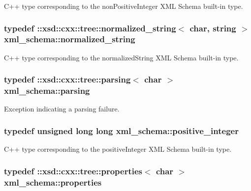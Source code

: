 C++ type corresponding to the non\-Positive\-Integer X\-M\-L Schema built-\/in type. 

\hypertarget{namespacexml__schema_a429c44c2779bb6c82332127aa59c61fe}{
\subsubsection[{normalized\-\_\-string}]{\setlength{\rightskip}{0pt plus 5cm}typedef \-::xsd\-::cxx\-::tree\-::normalized\-\_\-string$<$ char, {\bf string} $>$ {\bf xml\-\_\-schema\-::normalized\-\_\-string}}}\label{namespacexml__schema_a429c44c2779bb6c82332127aa59c61fe}


C++ type corresponding to the normalized\-String X\-M\-L Schema built-\/in type. 

\hypertarget{namespacexml__schema_a150f88d7d2156ae81807b142038684f5}{
\subsubsection[{parsing}]{\setlength{\rightskip}{0pt plus 5cm}typedef \-::xsd\-::cxx\-::tree\-::parsing$<$ char $>$ {\bf xml\-\_\-schema\-::parsing}}}\label{namespacexml__schema_a150f88d7d2156ae81807b142038684f5}


Exception indicating a parsing failure. 

\hypertarget{namespacexml__schema_abe9d639a15a121d2868ae2f9c974ca24}{
\subsubsection[{positive\-\_\-integer}]{\setlength{\rightskip}{0pt plus 5cm}typedef unsigned long long {\bf xml\-\_\-schema\-::positive\-\_\-integer}}}\label{namespacexml__schema_abe9d639a15a121d2868ae2f9c974ca24}


C++ type corresponding to the positive\-Integer X\-M\-L Schema built-\/in type. 

\hypertarget{namespacexml__schema_aba199bc39c8b21c427369c27d2bcfc8c}{
\subsubsection[{properties}]{\setlength{\rightskip}{0pt plus 5cm}typedef \-::xsd\-::cxx\-::tree\-::properties$<$ char $>$ {\bf xml\-\_\-schema\-::properties}}}\label{namespacexml__schema_aba199bc39c8b21c427369c27d2bcfc8c}


